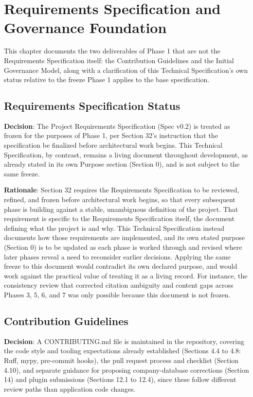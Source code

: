 \chapter{Requirements Specification and Governance Foundation}

This chapter documents the two deliverables of Phase 1 that are not the Requirements Specification itself: the Contribution Guidelines and the Initial Governance Model, along with a clarification of this Technical Specification's own status relative to the freeze Phase 1 applies to the base specification.

\section{Requirements Specification Status}

\textbf{Decision}: The Project Requirements Specification (Spec v0.2) is treated as frozen for the purposes of Phase 1, per Section 32's instruction that the specification be finalized before architectural work begins. This Technical Specification, by contrast, remains a living document throughout development, as already stated in its own Purpose section (Section 0), and is not subject to the same freeze.

\textbf{Rationale}: Section 32 requires the Requirements Specification to be reviewed, refined, and frozen before architectural work begins, so that every subsequent phase is building against a stable, unambiguous definition of the project. That requirement is specific to the Requirements Specification itself, the document defining what the project is and why. This Technical Specification instead documents how those requirements are implemented, and its own stated purpose (Section 0) is to be updated as each phase is worked through and revised where later phases reveal a need to reconsider earlier decisions. Applying the same freeze to this document would contradict its own declared purpose, and would work against the practical value of treating it as a living record. For instance, the consistency review that corrected citation ambiguity and content gaps across Phases 3, 5, 6, and 7 was only possible because this document is not frozen.

\section{Contribution Guidelines}

\textbf{Decision}: A CONTRIBUTING.md file is maintained in the repository, covering the code style and tooling expectations already established (Sections 4.4 to 4.8: Ruff, mypy, pre-commit hooks), the pull request process and checklist (Section 4.10), and separate guidance for proposing company-database corrections (Section 14) and plugin submissions (Sections 12.1 to 12.4), since these follow different review paths than application code changes.

